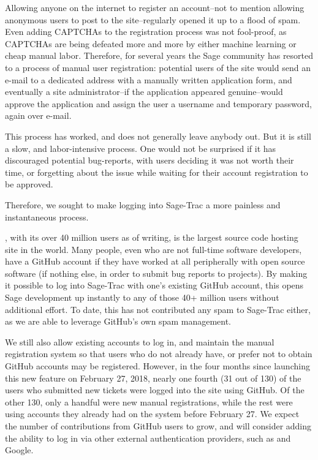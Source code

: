 Allowing anyone on the internet to register an account--not to mention allowing
anonymous users to post to the site--regularly opened it up to a flood of spam.
Even adding CAPTCHAs to the registration process was not fool-proof, as
CAPTCHAs are being defeated more and more by either machine learning or cheap
manual labor.  Therefore, for several years the Sage community has resorted
to a process of manual user registration: potential users of the site would
send an e-mail to a dedicated address with a manually written application form,
and eventually a site administrator--if the application appeared genuine--would
approve the application and assign the user a username and temporary password,
again over e-mail.

This process has worked, and does not generally leave anybody out.  But it is
still a slow, and labor-intensive process.  One would not be surprised if it
has discouraged potential bug-reports, with users deciding it was not worth
their time, or forgetting about the issue while waiting for their account
registration to be approved.

Therefore, we sought to make logging into Sage-Trac a more painless and
instantaneous process.

\GitHub, with its over 40 million users as of writing, is the largest source
code hosting site in the world.  Many people, even who are not full-time
software developers, have a GitHub account if they have worked at all
peripherally with open source software (if nothing else, in order to submit bug
reports to projects).  By making it possible to log into Sage-Trac with one's
existing GitHub account, this opens Sage development up instantly to any of
those 40+ million users without additional effort.  To date, this has not
contributed any spam to Sage-Trac either, as we are able to leverage GitHub's
own spam management.

We still also allow existing accounts to log in, and maintain the manual
registration system so that users who do not already have, or prefer not to
obtain GitHub accounts may be registered.  However, in the four months since
launching this new feature on February 27, 2018, nearly one fourth (31 out of
130) of the users who submitted new tickets were logged into the site using
GitHub.  Of the other 130, only a handful were new manual registrations, while
the rest were using accounts they already had on the system before February 27.
We expect the number of contributions from GitHub users to grow, and will
consider adding the ability to log in via other external authentication
providers, such as \GitLab and Google.


